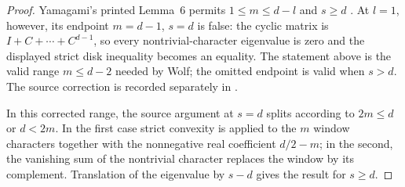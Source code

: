 \begin{proof}
    \leanok
    Yamagami's printed Lemma~6 permits $1\le m\le d-l$ and $s\ge d$
    \cite[pp.~523--524]{Yamagami1993Cyclic}.  At $l=1$, however, its endpoint
    $m=d-1$, $s=d$ is false: the cyclic matrix is
    $I+C+\cdots+C^{d-1}$, so every nontrivial-character eigenvalue is zero and
    the displayed strict disk inequality becomes an equality.  The statement
    above is the valid range $m\le d-2$ needed by Wolf; the omitted endpoint
    is valid when $s>d$.  The source correction is recorded separately in
    \cite{gap:yamagami_lemma6_endpoint}.

    In this corrected range, the source argument at $s=d$ splits according to
    $2m\le d$ or $d<2m$.  In the first case strict convexity is applied to the
    $m$ window characters together with the nonnegative real coefficient
    $d/2-m$; in the second, the vanishing sum of the nontrivial character
    replaces the window by its complement.  Translation of the eigenvalue by
    $s-d$ gives the result for $s\ge d$.
\end{proof}

